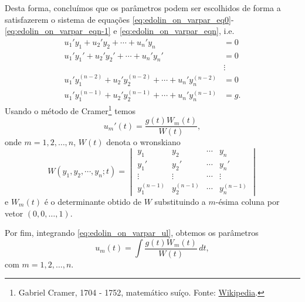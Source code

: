 Desta forma, concluímos que os parâmetros podem ser escolhidos de forma a satisfazerem o sistema de equações \eqref{eq:edolin_on_varpar_eq0}-\eqref{eq:edolin_on_varpar_eqn-1} e \eqref{eq:edolin_on_varpar_eqn}, i.e.
\begin{align}
  u_1'y_1+u_2'y_2+\cdots +u_n'y_n &= 0 \\
  u_1'y_1'+u_2'y_2'+\cdots +u_n'y_n' &= 0 \\
  &\vdots \\
  u_1'y_1^{(n-2)}+u_2'y_2^{(n-2)}+\cdots +u_n'y_n^{(n-2)} &= 0 \\
  u_1'y_1^{(n-1)}+u_2'y_2^{(n-1)}+\cdots +u_n'y_n^{(n-1)} &= g.
\end{align}
Usando o método de Cramer\footnote{Gabriel Cramer, 1704 - 1752, matemático suíço. Fonte: \href{https://en.wikipedia.org/wiki/Gabriel_Cramer}{Wikipedia}.} temos
\begin{equation}\label{eq:edolin_on_varpar_ul}
  u_m'(t) = \frac{g(t)W_m(t)}{W(t)},
\end{equation}
onde $m=1,2,\dotsc,n$, $W(t)$ denota o wronskiano
\begin{equation}
  W(y_1,y_2,\cdots,y_n;t) =
  \begin{vmatrix}
    y_1 & y_2 & \cdots & y_n \\
    y_1' & y_2' & \cdots & y_n' \\
    \vdots & \vdots & \cdots & \vdots \\
    y_1^{(n-1)} & y_2^{(n-1)} & \cdots & y_n^{(n-1)}
  \end{vmatrix}
\end{equation}
e $W_m(t)$ é o determinante obtido de $W$ substituindo a $m$-ésima coluna por vetor $(0, 0, \dotsc, 1)$.

Por fim, integrando \eqref{eq:edolin_on_varpar_ul}, obtemos os parâmetros
\begin{equation}
  u_m(t) = \int \frac{g(t)W_m(t)}{W(t)}\,dt,
\end{equation}
com $m=1,2,\dotsc,n$.

